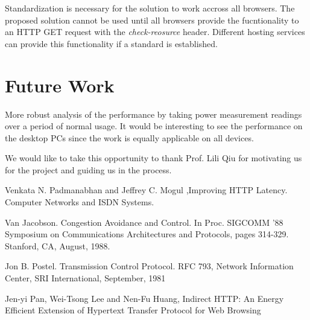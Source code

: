 \documentclass{sigplanconf}
\begin{document}
Standardization is necessary for the solution to work accross all browsers. The proposed solution cannot be used until all browsers provide the fucntionality to an HTTP GET request with the {\it check-reosurce} header. Different hosting services can provide this functionality if a standard is established.

\section{Future Work}

More robust analysis of the performance by taking power measurement readings over a period of normal usage. It would be interesting to see the performance on the desktop PCs since the work is equally applicable on all devices. 

\acks

We would like to take this opportunity to thank Prof. Lili Qiu for motivating us for the project and guiding us in the process.




\begin{thebibliography}{}
\softraggedright

 Venkata N. Padmanabhan and Jeffrey C. Mogul ,Improving HTTP Latency. Computer Networks and ISDN Systems.

Van Jacobson. Congestion Avoidance and Control. In Proc. SIGCOMM ’88 Symposium on Communications Architectures and Protocols, pages 314-329. Stanford, CA, August, 1988.

Jon B. Postel. Transmission Control Protocol. RFC 793, Network Information Center, SRI International, September, 1981

Jen-yi Pan, Wei-Tsong Lee and Nen-Fu Huang, Indirect HTTP: An Energy Efficient Extension of Hypertext Transfer Protocol for Web Browsing

\end{thebibliography}
\end{document}
